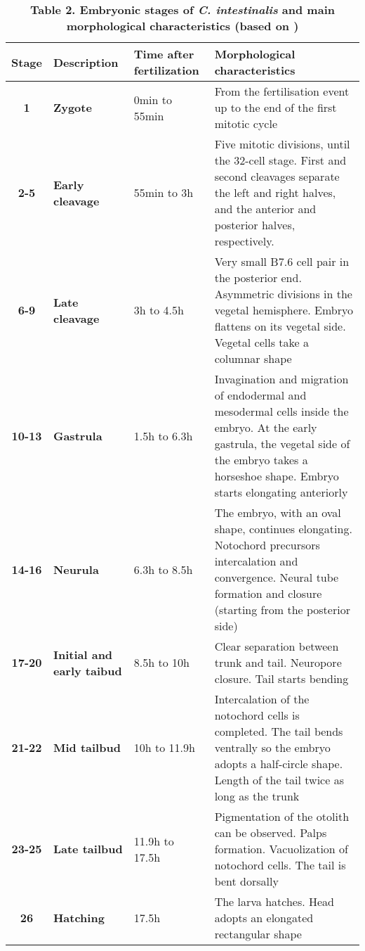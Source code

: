 \label{Table_Ciona}
\begin{sidewaystable}
    \centering

\caption*{\textbf{Table 2. Embryonic stages of \textit{C. intestinalis} and main morphological characteristics (based on \citealp{Hotta2007}) }}
\begin{tabular}{|c|p{3cm}|p{3cm}|p{10cm}|}
\hline
\textbf{Stage}&\textbf{Description}&\textbf{Time after fertilization}& \textbf{Morphological characteristics} \\
\hline
\textbf{1}	& \textbf{Zygote}		& 0min to 55min 	&	From the fertilisation event up to the end of the first mitotic cycle \\
%
\textbf{2-5}	& \textbf{Early cleavage}& 55min to 3h	& Five mitotic divisions, until the 32-cell stage. First and second cleavages separate the left and right halves, and the anterior and posterior halves, respectively.  
\\
%
\textbf{6-9}	& \textbf{Late cleavage}& 3h to 4.5h	& Very small B7.6 cell pair in the posterior end. Asymmetric divisions in the vegetal hemisphere. Embryo flattens on its vegetal side. Vegetal cells take a columnar shape\\
%
\textbf{10-13}	& \textbf{Gastrula}	& 1.5h to 6.3h	& Invagination and migration of endodermal and mesodermal cells inside the embryo. At the early gastrula, the vegetal side of the embryo takes a horseshoe shape. Embryo starts elongating anteriorly \\
%
\textbf{14-16}	& \textbf{Neurula}	& 6.3h to 8.5h	& The embryo, with an oval shape, continues elongating. Notochord precursors  intercalation and convergence. Neural tube formation and closure (starting from the posterior side)\\
%
\textbf{17-20}	& \textbf{Initial and early taibud}	& 8.5h to 10h	& Clear separation between trunk and tail. Neuropore closure. Tail starts bending \\
%
\textbf{21-22}	& \textbf{Mid tailbud}	& 10h to 11.9h	& Intercalation of the notochord cells is completed. The tail bends ventrally so the embryo adopts a half-circle shape. Length of the tail twice as long as the trunk	\\
%
\textbf{23-25}	& \textbf{Late tailbud}	& 11.9h to 17.5h 	& Pigmentation of the otolith can be observed. Palps formation. Vacuolization of notochord cells. The tail is bent dorsally   \\
%
\textbf{26}		& \textbf{Hatching}	& 17.5h 	& The larva hatches. Head adopts an elongated rectangular shape \\

\hline
\end{tabular}
\end{sidewaystable}